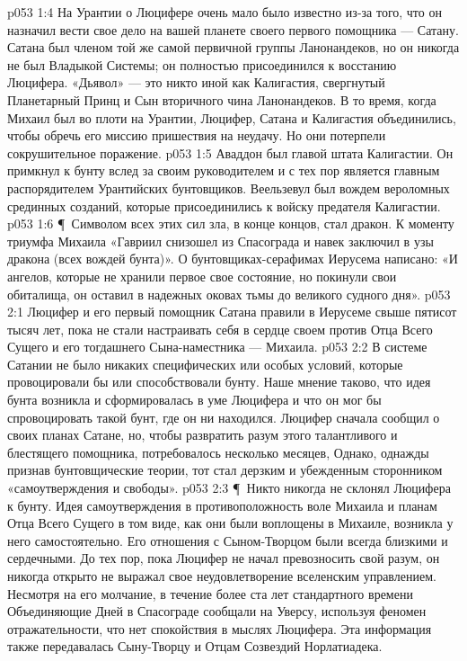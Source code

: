\vs p053 1:4 На Урантии о Люцифере очень мало было известно из\hyp{}за того, что он назначил вести свое дело на вашей планете своего первого помощника --- Сатану. Сатана был членом той же самой первичной группы Ланонандеков, но он никогда не был Владыкой Системы; он полностью присоединился к восстанию Люцифера. «Дьявол» --- это никто иной как Калигастия, свергнутый Планетарный Принц и Сын вторичного чина Ланонандеков. В то время, когда Михаил был во плоти на Урантии, Люцифер, Сатана и Калигастия объединились, чтобы обречь его миссию пришествия на неудачу. Но они потерпели сокрушительное поражение.
\vs p053 1:5 Аваддон был главой штата Калигастии. Он примкнул к бунту вслед за своим руководителем и с тех пор является главным распорядителем Урантийских бунтовщиков. Веельзевул был вождем вероломных срединных созданий, которые присоединились к войску предателя Калигастии.
\vs p053 1:6 \P\ Символом всех этих сил зла, в конце концов, стал дракон. К моменту триумфа Михаила «Гавриил снизошел из Спасограда и навек заключил в узы дракона (всех вождей бунта)». О бунтовщиках\hyp{}серафимах Иерусема написано: «И ангелов, которые не хранили первое свое состояние, но покинули свои обиталища, он оставил в надежных оковах тьмы до великого судного дня».
\vs p053 2:1 Люцифер и его первый помощник Сатана правили в Иерусеме свыше пятисот тысяч лет, пока не стали настраивать себя в сердце своем против Отца Всего Сущего и его тогдашнего Сына\hyp{}наместника --- Михаила.
\vs p053 2:2 В системе Сатании не было никаких специфических или особых условий, которые провоцировали бы или способствовали бунту. Наше мнение таково, что идея бунта возникла и сформировалась в уме Люцифера и что он мог бы спровоцировать такой бунт, где он ни находился. Люцифер сначала сообщил о своих планах Сатане, но, чтобы развратить разум этого талантливого и блестящего помощника, потребовалось несколько месяцев, Однако, однажды признав бунтовщические теории, тот стал дерзким и убежденным сторонником «самоутверждения и свободы».
\vs p053 2:3 \P\ Никто никогда не склонял Люцифера к бунту. Идея самоутверждения в противоположность воле Михаила и планам Отца Всего Сущего в том виде, как они были воплощены в Михаиле, возникла у него самостоятельно. Его отношения с Сыном\hyp{}Творцом были всегда близкими и сердечными. До тех пор, пока Люцифер не начал превозносить свой разум, он никогда открыто не выражал свое неудовлетворение вселенским управлением. Несмотря на его молчание, в течение более ста лет стандартного времени Объединяющие Дней в Спасограде сообщали на Уверсу, используя феномен отражательности, что нет спокойствия в мыслях Люцифера. Эта информация также передавалась Сыну\hyp{}Творцу и Отцам Созвездий Норлатиадека.
